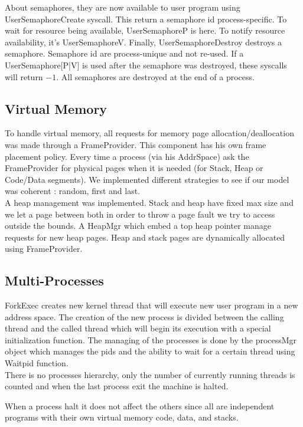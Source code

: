 About semaphores, they are now available to user program using
UserSemaphoreCreate syscall. This return a semaphore id process-specific. To
wait for resource being available, \textrm{UserSemaphoreP} is here. To notify resource
availability, it's\textrm{ UserSemaphoreV}. Finally,\textrm{ UserSemaphoreDestroy} destroys a
semaphore. Semaphore id are process-unique and not re-used. If a
UserSemaphore[P|V] is used after the semaphore was destroyed, these syscalls
will return $-1$. All semaphores are destroyed at the end of a process.

\subsection{Virtual Memory}

To handle virtual memory, all requests for memory page allocation/deallocation
was made through a FrameProvider. This component has his own frame placement
policy. Every time a process (via his AddrSpace) ask the FrameProvider for
physical pages when it is needed (for Stack, Heap or Code/Data segments).
We implemented different strategies to see if our model was coherent : random,
first and last.\\

A heap management was implemented. Stack and heap have fixed max size and
we let a page between both in order to throw a page fault we try to access
outside the bounds. A HeapMgr which embed a top heap pointer manage requests for
new heap pages.
Heap and stack pages are dynamically allocated using FrameProvider.

\subsection{Multi-Processes}
ForkExec creates new kernel thread that will execute new user program in a new
address space. The creation of the new process is divided between the calling
thread and the called thread which will begin its execution with a special
initialization function. The managing of the processes is done by the processMgr
object which manages the pids and the ability to wait for a certain thread using
Waitpid function.\\

There is no processes hierarchy, only the number of currently running threads is
counted and when the last process exit the machine is halted.

When a process halt it does not affect the others since all are independent
programs with their own virtual memory code, data, and stacks.\\

